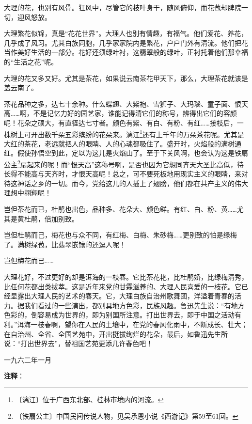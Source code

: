 \documentclass[12pt,UTF-8,openany]{ctexbook}
\begin{document}
\begin{normalsize}
    大理的花，也别有风骨。狂风中，尽管它的枝叶身干，随风俯仰，而花苞却脾院一切，迎风怒放。
    
    大理繁花似锦，真是“花花世界”。大理人也别有情趣，有福气。他们爱花、养花，几乎成了风习。尤其白族同胞，几乎家家院内是繁花，户户门外有清流。他们把花当作美好生活的一部分。花好还须绿叶衬，这翡翠般的绿叶，正衬托着他们那幸福的“生活之花”呢。
    
    大理的花又多又好。尤其是茶花，如果说云南茶花甲天下，那么，大理茶花就该是盖云南了。
    
    茶花品种之多，达七十余种。什么蝶翅、大紫袍、雪狮子、大玛瑙、童子面、恨天高……啊，不是记忆力好的园艺家，谁能记得清它们的称号，辨得出它们的容颜呢！花朵之硕大，有直径达七寸者。颜色有紫、有白、有粉、有红……接枝后，一株树上可开出数千朵五彩缤纷的花朵来。漓江\footnote{〔漓江〕位于广西东北部、桂林市境内的河流。}还有上千年的万朵茶花呢。尤其是大红的茶花，老远就把人的眼睛、人的心魂都吸住了。盛开时，火焰般的满树通红。假使孙悟空到此，定以为这儿是火焰山了。至于下关风啊，也会认为这是铁扇公主\footnote{〔铁扇公主〕中国民间传说人物，见吴承恩小说《西游记》第59至61回。}扇起来的呢！而“恨天高”这称号啊，是否也因为它想同齐天大圣比高低，待长得不能高与天齐时，才恨天高呢！总之，可不要死板地用现实主义的眼睛，来对待这神话之乡的一切。而今，党给这儿的人插上了翅膀，他们都在共产主义的伟大理想中翱翔呢！
    
    岂但茶花而已，杜鹃也出色，品种多、花朵大、颜色鲜。有红、白、粉、黄……尤其是黄杜鹃，倍加别致。
    
    岂但杜鹃而己，梅花也与众不同，有红梅、白梅、朱砂梅……更别致的怕是绿梅了。满树绿苞，比翡翠嵌镶的还逗人呢！
    
    岂但梅花而已……
    
    大理花好，不过更好的却是洱海的一枝春。它比茶花艳，比杜鹃娇，比绿梅清秀，比任何花都出类拔萃。这是近年来党的甘霖滋养的、大理人民喜爱的一枝花。它已经显露出大理人民的艺术的春天。它，大理白族自治州歌舞团，洋溢着青春的活力。据我们看过的一些演出，都别具地方色彩，民族风趣。鲁迅先生说：“有地方色彩的，倒容易成为世界的，即为别国所注意。打出世界去，即于中国之活动有利。”洱海一枝春啊，望你在人民的土壤中，在党的春风化雨中，不断成长、壮大；在自治州、全省、全国艺苑中，开出挺拔绚烂的花朵，最后，如鲁迅先生所说：“打出世界去”，替祖国艺苑更添几许春色吧！
    
    \hfill 一九六二年一月
    
\end{normalsize}


\newpage

\textbf{注释}：
\end{document}
